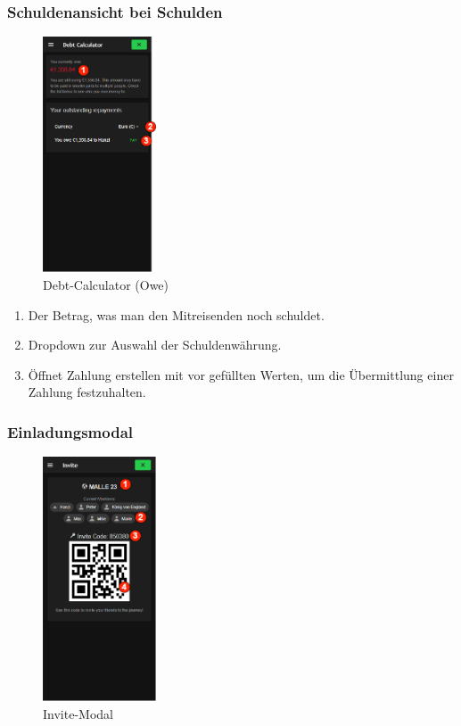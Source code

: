 \subsubsection{Schuldenansicht bei Schulden}\label{debt-calculator_(owe)}
\begin{figure}[H]
	\centering
	\includegraphics[width=0.3\textwidth]{img/pages_numbers/debt-calculator_(owe).drawio}
	\caption[Debt-Calculator (Owe)]{Debt-Calculator (Owe)}
	\label{fig:debt-calculator_(owe)}
\end{figure}
\begin{enumerate}[label=\protect\circled{\arabic*}]
	\item Der Betrag, was man den Mitreisenden noch schuldet.
	\item Dropdown zur Auswahl der Schuldenwährung.
	\item Öffnet Zahlung erstellen mit vor gefüllten Werten, um die Übermittlung einer Zahlung festzuhalten.
\end{enumerate}

\subsubsection{Einladungsmodal}\label{invite-modal}
\begin{figure}[H]
	\centering
	\includegraphics[width=0.3\textwidth]{img/pages_numbers/invite-modal.drawio}
	\caption[Invite-Modal]{Invite-Modal}
	\label{fig:invite-modal}
\end{figure}

